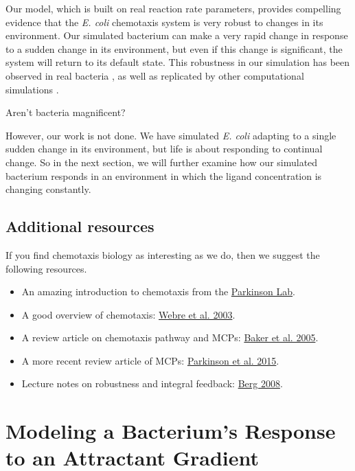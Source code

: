 Our model, which is built on real reaction rate parameters, provides compelling evidence that the \textit{E. coli} chemotaxis system is very robust to changes in its environment. Our simulated bacterium can make a very rapid change in response to a sudden change in its environment, but even if this change is significant, the system will return to its default state. This robustness in our simulation has been observed in real bacteria \citep{Shimizu_2005, Krembel_2015}, as well as replicated by other computational simulations \citep{Bray_1993}.

Aren't bacteria magnificent?

However, our work is not done. We have simulated \textit{E. coli} adapting to a single sudden change in its environment, but life is about responding to continual change. So in the next section, we will further examine how our simulated bacterium responds in an environment in which the ligand concentration is changing constantly.


\FloatBarrier
{}
\subsection{Additional resources}

If you find chemotaxis biology as interesting as we do, then we suggest the following resources.
\begin{itemize}
 \item An amazing introduction to chemotaxis from the \href{http://chemotaxis.biology.utah.edu/Parkinson_Lab/projects/ecolichemotaxis/ecolichemotaxis.html}{Parkinson Lab}.
 \item A good overview of chemotaxis: \href{https://doi.org/10.1016/S0960-9822(02)01424-0)}{Webre et al. 2003}.
 \item A review article on chemotaxis pathway and MCPs: \href{https://pubmed.ncbi.nlm.nih.gov/16369945}{Baker et al. 2005}.
 \item A more recent review article of MCPs: \href{https://www.sciencedirect.com/science/article/abs/pii/S0966842X15000578}{Parkinson et al. 2015}.
 \item Lecture notes on robustness and integral feedback: \href{https://www.weizmann.ac.il/mcb/UriAlon/sites/mcb.UriAlon/files/uploads/lecture_notes_-_robustness_in_bacterial_chemotaxis_.pdf}{Berg 2008}.
\end{itemize}


\FloatBarrier
{}

\section{Modeling a Bacterium's Response to an Attractant Gradient}
\label{sec:gradient}

